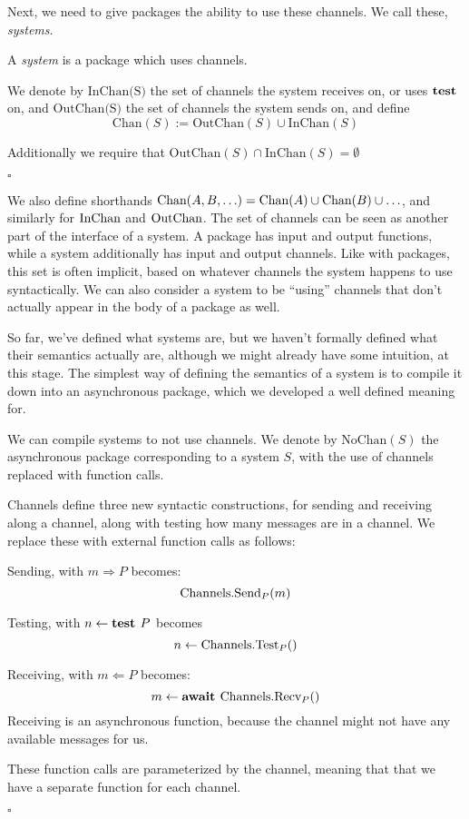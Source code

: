 Next, we need to give packages the ability to use these channels.
We call these, \emph{systems}.

\begin{definition}[Systems]
A \emph{system} is a package which uses channels.

We denote by $\text{InChan(S)}$ the set of channels the system receives on,
or uses $\textbf{test}$ on,
and $\text{OutChan(S)}$ the set of channels the system sends on,
and define
$$
\text{Chan}(S) := \text{OutChan}(S) \cup \text{InChan}(S)
$$

Additionally we require that $\text{OutChan}(S) \cap \text{InChan}(S) = \emptyset$

$\square$
\end{definition}

We also define shorthands $\text{Chan}(A, B, \ldots) = \text{Chan}(A) \cup \text{Chan}(B) \cup \ldots$,
and similarly for $\text{InChan}$ and $\text{OutChan}$.
The set of channels can be seen as another part of the interface
of a system.
A package has input and output functions, while a system additionally
has input and output channels.
Like with packages, this set is often implicit, based on whatever
channels the system happens to use syntactically.
We can also consider a system to be ``using'' channels that don't
actually appear in the body of a package as well.

So far, we've defined what systems are, but we haven't formally
defined what their semantics actually are,
although we might already have some intuition, at this stage.
The simplest way of defining the semantics of a system
is to compile it down into an asynchronous package,
which we developed a well defined meaning for.

\begin{definition}
We can compile systems to not use channels.
We denote by $\text{NoChan}(S)$ the asynchronous package corresponding to
a system $S$, with the use of channels replaced with function calls.

Channels define three new syntactic constructions, for sending and receiving
along a channel, along with testing how many messages are in a channel.
We replace these with external function calls as follows:


Sending, with $m \Rightarrow P$ becomes:
$$
\text{Channels}.\text{Send}_P(m)
$$

Testing, with $n \gets \textbf{test } P$ becomes
$$
n \gets \text{Channels}.\text{Test}_P()
$$

Receiving, with $m \Leftarrow P$ becomes:
$$
m \gets \textbf{await } \text{Channels}.\text{Recv}_P()
$$
Receiving is an asynchronous function, because the channel might not have
any available messages for us.

These function calls are parameterized by the channel, meaning
that that we have a separate function for each channel.

$\square$
\end{definition}

